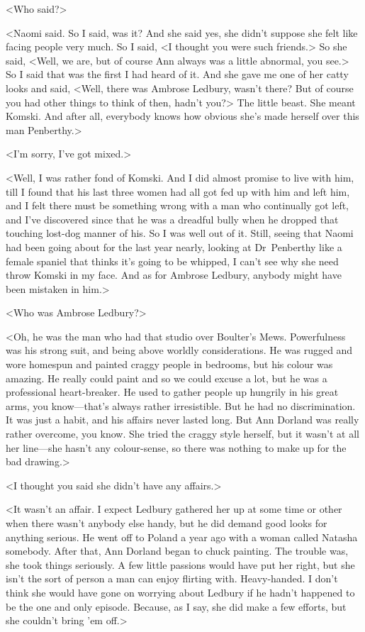 <Who said?>

<Naomi said. So I said, was it? And she said yes, she didn't suppose she felt like facing people very much. So I said, <I thought you were such friends.> So she said, <Well, we are, but of course Ann always was a little abnormal, you see.> So I said that was the first I had heard of it. And she gave me one of her catty looks and said, <Well, there was Ambrose Ledbury, wasn't there? But of course you had other things to think of then, hadn't you?> The little beast. She meant Komski. And after all, everybody knows how obvious she's made herself over this man Penberthy.>

<I'm sorry, I've got mixed.>

<Well, I was rather fond of Komski. And I did almost promise to live with him, till I found that his last three women had all got fed up with him and left him, and I felt there must be something wrong with a man who continually got left, and I've discovered since that he was a dreadful bully when he dropped that touching lost-dog manner of his. So I was well out of it. Still, seeing that Naomi had been going about for the last year nearly, looking at Dr~Penberthy like a female spaniel that thinks it's going to be whipped, I can't see why she need throw Komski in my face. And as for Ambrose Ledbury, anybody might have been mistaken in him.>

<Who was Ambrose Ledbury?>

<Oh, he was the man who had that studio over Boulter's Mews. Powerfulness was his strong suit, and being above worldly considerations. He was rugged and wore homespun and painted craggy people in bedrooms, but his colour was amazing. He really could paint and so we could excuse a lot, but he was a professional heart-breaker. He used to gather people up hungrily in his great arms, you know—that's always rather irresistible. But he had no discrimination. It was just a habit, and his affairs never lasted long. But Ann Dorland was really rather overcome, you know. She tried the craggy style herself, but it wasn't at all her line—she hasn't any colour-sense, so there was nothing to make up for the bad drawing.>

<I thought you said she didn't have any affairs.>

<It wasn't an affair. I expect Ledbury gathered her up at some time or other when there wasn't anybody else handy, but he did demand good looks for anything serious. He went off to Poland a year ago with a woman called Natasha somebody. After that, Ann Dorland began to chuck painting. The trouble was, she took things seriously. A few little passions would have put her right, but she isn't the sort of person a man can enjoy flirting with. Heavy-handed. I don't think she would have gone on worrying about Ledbury if he hadn't happened to be the one and only episode. Because, as I say, she did make a few efforts, but she couldn't bring 'em off.>

